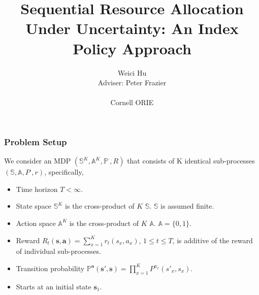 \documentclass{beamer}
\newcommand{\av}{\mathbf{a}}
\newcommand{\allstates}{\mathbb{S}^K}
\newcommand{\allstate}{\mathbf{s}}
\newcommand{\allactions}{\mathbb{A}^K}
\newcommand{\allaction}{\av}
\newcommand{\allpr}{\mathbb{P}}
\newcommand{\allr}{R}
\newcommand{\subr}{r}
\newcommand{\substates}{\mathbb{S}}
\newcommand{\substate}{s}
\newcommand{\subactions}{\mathbb{A}}
\newcommand{\subpr}{P}
\newcommand{\subaction}{a}
\begin{document}
\title{Sequential Resource Allocation Under Uncertainty: An Index Policy Approach}
\author{Weici Hu\\
Adviser: Peter Frazier\\
\hspace{1mm}\\
Cornell ORIE}
\begin{frame}
   \maketitle
\end{frame}

\begin{frame}
\frametitle{Problem Setup}
We consider an MDP $(\allstates,\allactions,\allpr^{\cdot},\allr)$ that consists of K identical sub-processes $(\substates,\subactions,\subpr^{\cdot},\subr)$, specifically,
\begin{itemize}
\item Time horizon $T<\infty$.
\item State space $\allstates$ is the cross-product of $K$ $\substates$. $\substates$ is assumed finite.
\item Action space $\allactions$ is the cross-product of $K$ $\subactions$. $\subactions=\{0,1\}$.
\item Reward $\allr_t(\allstate,\allaction) = \sum_{x=1}^K \subr_t(\substate_x,\subaction_x)$, $1\leq t\leq T$, is additive of the reward of individual sub-processes.
\item Transition probability $\allpr^{\allaction}(\allstate',\allstate) = \prod_{x=1}^{K}\subpr^{\subaction_x}(\substate'_x,\substate_x)$.
\item Starts at an initial state $\allstate_1$.
\end{itemize}
\end{frame}
\end{document}
